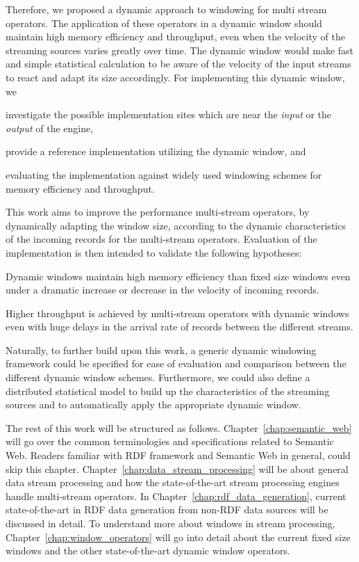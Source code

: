 Therefore, we proposed a dynamic approach to windowing for multi stream operators.
The application of these operators in a dynamic window should maintain high memory efficiency and throughput,
even when the velocity of the streaming sources varies greatly over time. 
The dynamic window would make fast and simple statistical calculation to be 
aware of the velocity of the input streams to react and adapt its size accordingly. 
For implementing this dynamic window, we 
\renewcommand{\labelenumi}{(\roman{enumi})}
\begin{enumerate*}
    \item investigate the possible implementation sites which are near the \emph{input}
    or the \emph{output} of the engine, 
    \item provide a reference implementation utilizing the dynamic window, and 
    \item evaluating the implementation against widely used windowing schemes for 
    memory efficiency and throughput. 
\end{enumerate*}


This work aims to improve the performance multi-stream operators, 
by dynamically adapting the window size, according to the dynamic characteristics
of the incoming records for the multi-stream operators. Evaluation of 
the implementation is then intended to validate the following hypotheses: 

\begin{hyp}
    Dynamic windows maintain high memory efficiency than 
    fixed size windows even under a dramatic increase or 
    decrease in the velocity of incoming records. 
\end{hyp}

\begin{hyp}
    Higher throughput is achieved by multi-stream operators 
    with dynamic windows even with huge delays in the arrival
    rate of records between the different streams.
\end{hyp}

Naturally, to further build upon this work, a generic dynamic windowing 
framework could be specified for ease of evaluation and comparison between 
the different dynamic window schemes. Furthermore, we could also define a distributed 
statistical model to build up the characteristics of the streaming sources 
and to automatically apply the appropriate dynamic window. 


The rest of this work will be structured as follows. Chapter~\ref{chap:semantic_web} will 
go over the common terminologies and specifications related to Semantic Web. Readers familiar
with RDF framework and Semantic Web in general, could skip this chapter. 
Chapter~\ref{chap:data_stream_processing} will be about general data stream processing 
and how the state-of-the-art stream processing engines handle multi-stream operators. 
In Chapter~\ref{chap:rdf_data_generation}, current state-of-the-art in 
RDF data generation from non-RDF data sources will be discussed in detail. 
To understand more about windows in stream processing, Chapter~\ref{chap:window_operators}
will go into detail about the current fixed size windows and the other state-of-the-art 
dynamic window operators. 

